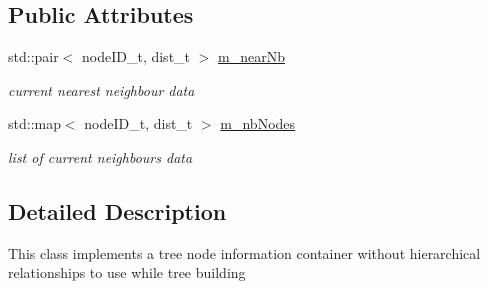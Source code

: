 \subsection*{\-Public \-Attributes}
\begin{DoxyCompactItemize}
\item 
\hypertarget{classprotoNode_acebd42184bada7a52e3d368a38a1d8cd}{std\-::pair$<$ node\-I\-D\-\_\-t, dist\-\_\-t $>$ \hyperlink{classprotoNode_acebd42184bada7a52e3d368a38a1d8cd}{m\-\_\-near\-Nb}}\label{classprotoNode_acebd42184bada7a52e3d368a38a1d8cd}

\begin{DoxyCompactList}\small\item\em current nearest neighbour data \end{DoxyCompactList}\item 
\hypertarget{classprotoNode_a5ebd181f21682d15861f073209672000}{std\-::map$<$ node\-I\-D\-\_\-t, dist\-\_\-t $>$ \hyperlink{classprotoNode_a5ebd181f21682d15861f073209672000}{m\-\_\-nb\-Nodes}}\label{classprotoNode_a5ebd181f21682d15861f073209672000}

\begin{DoxyCompactList}\small\item\em list of current neighbours data \end{DoxyCompactList}\end{DoxyCompactItemize}


\subsection{\-Detailed \-Description}
\-This class implements a tree node information container without hierarchical relationships to use while tree building 

